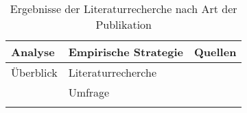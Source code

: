 \begin{longtable}{|p{}p{}p{}|}
    \textbf{Analyse} & \textbf{Empirische Strategie} & \textbf{Quellen} \\ \hline
    Überblick                                                                       &
    Literaturrecherche                                                              &
        \cite{chazette_knowledge_nodate} \cite{sokol_explainability_2020} \cite{tintarev2015explaining} \cite{kohl_explainability_2019} \cite{rosenfeld_explainability_2019} \cite{cassens_ambient_2019} \cite{cirqueira_scenario-based_2020} \cite{rjoob_towards_2021} \cite{thomson_knowledge--information_2020} \cite{chari_explanation_2020} \cite{nunes_systematic_2017} \cite{sovrano_modelling_2020} \cite{ribera2019can} \cite{gunning2019darpa} \cite{doshi2017towards} \cite{lim_2009_assessing} \cite{tintarev2007survey}
        \\
                                                                                    &
    Umfrage                                                                         &
        \cite{brennen_what_2020} 
    \\ \hline
        
\caption{Ergebnisse der Literaturrecherche nach Art der Publikation}
\label{tab:paper_types}
\end{longtable}



